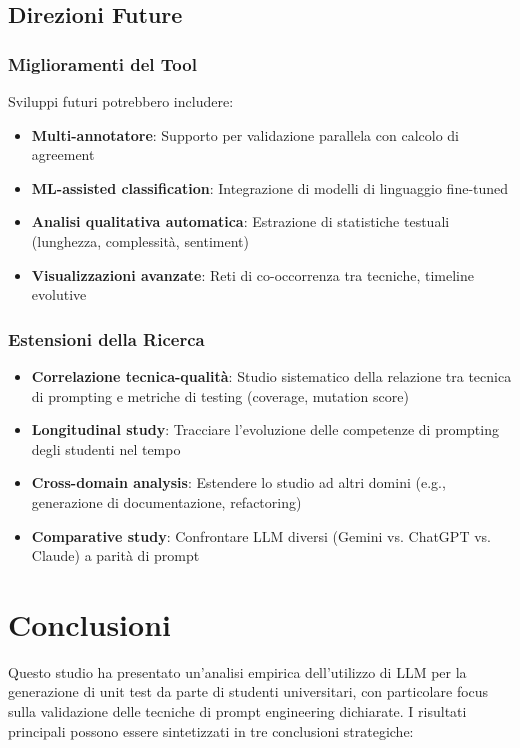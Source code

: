 \documentclass[a4paper,12pt]{article}
\begin{document}
\subsection{Direzioni Future}

\subsubsection{Miglioramenti del Tool}
Sviluppi futuri potrebbero includere:
\begin{itemize}
    \item \textbf{Multi-annotatore}: Supporto per validazione parallela con calcolo di agreement
    \item \textbf{ML-assisted classification}: Integrazione di modelli di linguaggio fine-tuned
    \item \textbf{Analisi qualitativa automatica}: Estrazione di statistiche testuali (lunghezza, complessità, sentiment)
    \item \textbf{Visualizzazioni avanzate}: Reti di co-occorrenza tra tecniche, timeline evolutive
\end{itemize}

\subsubsection{Estensioni della Ricerca}
\begin{itemize}
    \item \textbf{Correlazione tecnica-qualità}: Studio sistematico della relazione tra tecnica di prompting e metriche di testing (coverage, mutation score)
    \item \textbf{Longitudinal study}: Tracciare l'evoluzione delle competenze di prompting degli studenti nel tempo
    \item \textbf{Cross-domain analysis}: Estendere lo studio ad altri domini (e.g., generazione di documentazione, refactoring)
    \item \textbf{Comparative study}: Confrontare LLM diversi (Gemini vs. ChatGPT vs. Claude) a parità di prompt
\end{itemize}

\section{Conclusioni}

Questo studio ha presentato un'analisi empirica dell'utilizzo di LLM per la generazione di unit test da parte di studenti universitari, con particolare focus sulla validazione delle tecniche di prompt engineering dichiarate. I risultati principali possono essere sintetizzati in tre conclusioni strategiche:
\end{document}
